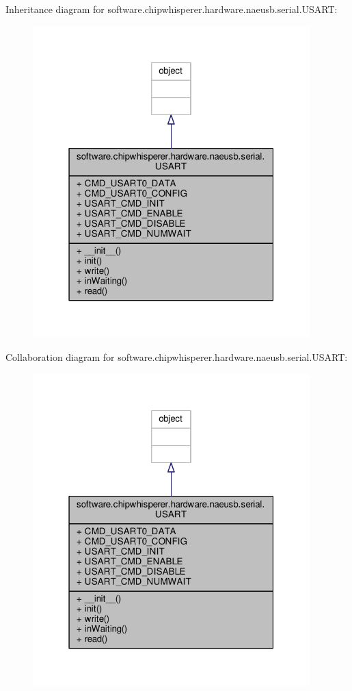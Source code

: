 Inheritance diagram for software.\+chipwhisperer.\+hardware.\+naeusb.\+serial.\+U\+S\+A\+R\+T\+:\nopagebreak
\begin{figure}[H]
\begin{center}
\leavevmode
\includegraphics[width=304pt]{dc/de4/classsoftware_1_1chipwhisperer_1_1hardware_1_1naeusb_1_1serial_1_1USART__inherit__graph}
\end{center}
\end{figure}


Collaboration diagram for software.\+chipwhisperer.\+hardware.\+naeusb.\+serial.\+U\+S\+A\+R\+T\+:\nopagebreak
\begin{figure}[H]
\begin{center}
\leavevmode
\includegraphics[width=304pt]{da/d4a/classsoftware_1_1chipwhisperer_1_1hardware_1_1naeusb_1_1serial_1_1USART__coll__graph}
\end{center}
\end{figure}


